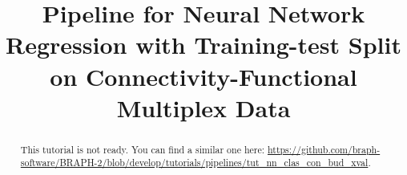 \documentclass[justified]{tufte-handout}
\title[Regression Training-test Split Connectivity-Functional Multiplex Data]{Pipeline for Neural Network Regression with Training-test Split on Connectivity-Functional Multiplex Data}
\begin{document}
\maketitle

\begin{abstract}
\noindent
This tutorial is not ready. You can find a similar one here: \url{https://github.com/braph-software/BRAPH-2/blob/develop/tutorials/pipelines/tut_nn_clas_con_bud_xval}.
\end{abstract}
\end{document}
